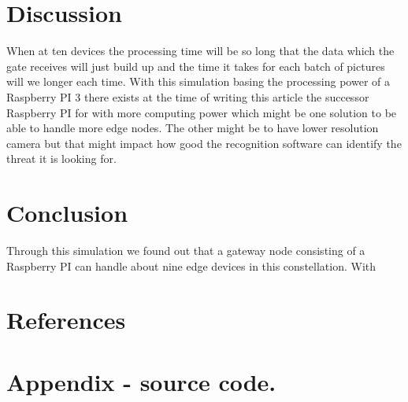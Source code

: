 \documentclass[a4paper,11pt,notitlepage,twocolumn]{article}
\begin{document}
  \section{Discussion}
    When at ten devices the processing time will be so long that the data which the gate receives
    will just build up and the time it takes for each batch of pictures will we longer each time.
    With this simulation basing the processing power of a Raspberry PI 3 there exists at the time
    of writing this article the successor Raspberry PI for with more computing power which
    might be one solution to be able to handle more edge nodes. The other might be to have lower
    resolution camera but that might impact how good the recognition software can identify
    the threat it is looking for.
    
  \section{Conclusion}
    Through this simulation we found out that a gateway node consisting of a Raspberry PI can
    handle about nine edge devices in this constellation. With 
    
  \section{References}
    
    

  \onecolumn
  \section{Appendix - source code.}
\end{document}
